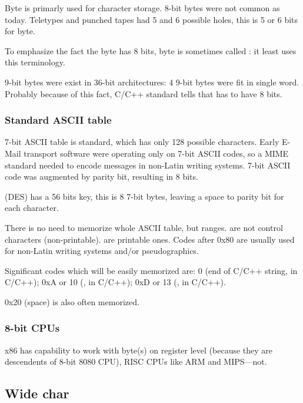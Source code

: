Byte is primarly used for character storage.
8-bit bytes were not common as today.
Teletypes and punched tapes had 5 and 6 possible holes, this is 5 or 6 bits for byte.

To emphasize the fact the byte has 8 bits, byte is sometimes called :
it least  uses this terminology.

9-bit bytes were exist in 36-bit architectures: 4 9-bit bytes were fit in single word.
Probably because of this fact, C/C++ standard tells that  has to have  8 bits.

\subsubsection{Standard ASCII table}

7-bit ASCII table is standard, which has only 128 possible characters.
Early E-Mail transport software were operating only on 7-bit ASCII codes, so a \ac{MIME} standard needed to encode messages
in non-Latin writing systems.
7-bit ASCII code was augmented by parity bit, resulting in 8 bits.

 (\ac{DES}) has a 56 bits key, this is 8 7-bit bytes,
leaving a space to parity bit for each character.

There is no need to memorize whole \ac{ASCII} table, but ranges.
 are not control characters (non-printable).
 are printable ones.
Codes after 0x80 are usually used for non-Latin writing systems and/or pseudographics.

Significant codes which will be easily memorized are:
0 (end of C/C++ string,  in C/C++);
0xA or 10 (,  in C/C++);
0xD or 13 (,  in C/C++).

0x20 (space) is also often memorized.

\subsubsection{8-bit CPUs}

x86 has capability to work with byte(s) on register level (because they are descendents of 8-bit 8080 CPU),
RISC CPUs like ARM and MIPS---not.

\subsection{Wide char}

